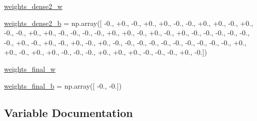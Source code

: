 \begin{DoxyCompactItemize}
\item 
\hyperlink{namespacepybullet-gym_1_1pybulletgym_1_1tests_1_1roboschool_1_1agents_1_1_reacher_py_bullet_env__v0__017may_ae16196306df41a5ca94bfa3ab811a36f}{weights\+\_\+dense2\+\_\+w}
\item 
\hyperlink{namespacepybullet-gym_1_1pybulletgym_1_1tests_1_1roboschool_1_1agents_1_1_reacher_py_bullet_env__v0__017may_aeebb23b1693a7e62dff5def168692733}{weights\+\_\+dense2\+\_\+b} = np.\+array(\mbox{[} -\/0., +0., -\/0., +0., +0., -\/0., -\/0., +0., +0., -\/0., +0., -\/0., -\/0., +0., +0., -\/0., -\/0., -\/0., -\/0., +0., +0., -\/0., +0., -\/0., +0., -\/0., -\/0., -\/0., -\/0., -\/0., -\/0., +0., -\/0., +0., -\/0., +0., -\/0., +0., -\/0., -\/0., -\/0., -\/0., -\/0., -\/0., -\/0., -\/0., -\/0., -\/0., +0., +0., -\/0., +0., +0., -\/0., -\/0., -\/0., +0., +0., +0., -\/0., -\/0., -\/0., +0., -\/0.\mbox{]})
\item 
\hyperlink{namespacepybullet-gym_1_1pybulletgym_1_1tests_1_1roboschool_1_1agents_1_1_reacher_py_bullet_env__v0__017may_ac34e3e7c3fe01a9344feb1ca5ef6cf8a}{weights\+\_\+final\+\_\+w}
\item 
\hyperlink{namespacepybullet-gym_1_1pybulletgym_1_1tests_1_1roboschool_1_1agents_1_1_reacher_py_bullet_env__v0__017may_ae7089686365dcf9e499859a91a728239}{weights\+\_\+final\+\_\+b} = np.\+array(\mbox{[} -\/0., -\/0.\mbox{]})
\end{DoxyCompactItemize}


\subsection{Variable Documentation}
